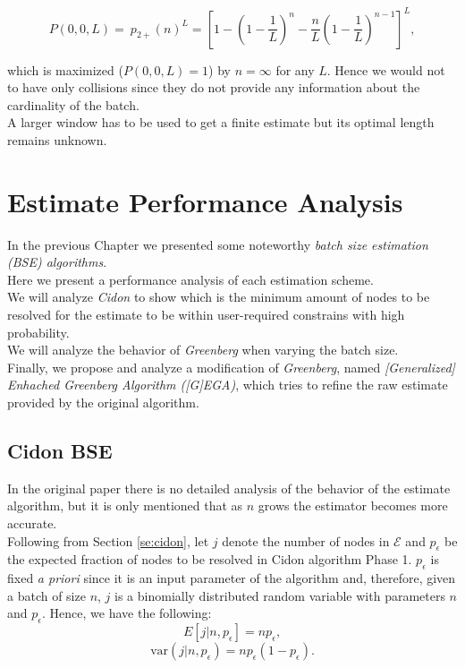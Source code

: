 \documentclass[11pt,a4paper,twoside,openright]{book}
\newcommand{\pc}{p_{\epsilon}}
\begin{document}
\begin{equation}
P(0,0,L)=\ p_{2+}(n)^{L} = \left[1-\left(1-\frac{1}{L}\right)^{n}-\frac{n}{L}\left(1-\frac{1}{L}\right)^{n-1}\right]^{L},
\end{equation}

\noindent which is maximized ($P(0,0,L)=1$) by $n=\infty$ for any $L$. Hence we would not to have only collisions since they do not provide any information about the cardinality of the batch.\\ A larger  window has to be used to get a finite estimate but its optimal length remains unknown.

\chapter{Estimate Performance Analysis}
\label{ch:Performance Analysis}

In the previous Chapter we presented some noteworthy  \emph{batch size estimation  (BSE) algorithms}.\\ Here we present a performance analysis of each estimation scheme.\\
We will analyze \emph{Cidon} to show which is the minimum amount of nodes to be resolved for the estimate to be within user-required constrains with high probability.\\  
We will analyze the behavior of \emph{Greenberg} when varying the batch size.\\
Finally, we propose and analyze a modification of \emph{Greenberg}, named \emph{[Generalized] Enhached Greenberg Algorithm ([G]EGA)}, which tries to refine the raw estimate provided by the original algorithm.
\section{Cidon BSE}


In the original paper \cite{cidon} there is no detailed analysis of the behavior of the estimate algorithm, but it is only mentioned that as $n$ grows the estimator becomes more accurate.\\
    
Following from Section \ref{se:cidon}, let $j$ denote the number of nodes in $\mathcal{E}$ and $\pc$ be the expected fraction of nodes to be resolved in Cidon algorithm  Phase 1. $\pc$ is fixed \emph{a priori} since it is an input parameter of the algorithm and, therefore, given a batch of size $n$, $j$ is a binomially distributed random variable with parameters $n$ and $\pc$. Hence, we have the following:
\begin{equation}
E[j|n,\pc]=n\pc ,
\label{cidon-e-estimate}
\end{equation}
\begin{equation}
\textrm{var}(j|n,\pc)=n\pc(1-\pc).
\end{equation}
\end{document}
